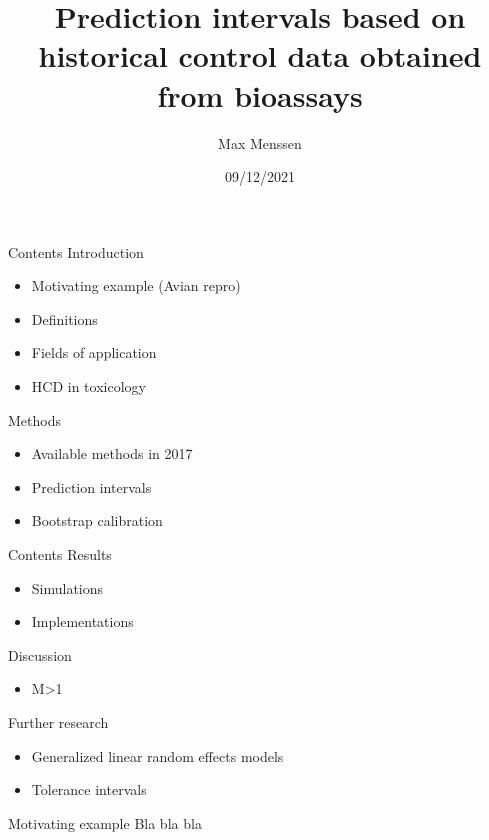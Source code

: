 \documentclass[
  ignorenonframetext,
]{beamer}
\title{Prediction intervals based on historical control data obtained
from bioassays}
\author{Max Menssen}
\date{09/12/2021}
\providecommand{\tightlist}{%
  \setlength{\itemsep}{0pt}\setlength{\parskip}{0pt}}
\begin{document}
\frame{\titlepage}

\begin{frame}{Contents}
\protect\hypertarget{contents}{}
Introduction

\begin{itemize}
\tightlist
\item
  Motivating example (Avian repro)
\item
  Definitions
\item
  Fields of application
\item
  HCD in toxicology
\end{itemize}

Methods

\begin{itemize}
\tightlist
\item
  Available methods in 2017
\item
  Prediction intervals
\item
  Bootstrap calibration
\end{itemize}
\end{frame}

\begin{frame}{Contents}
\protect\hypertarget{contents-1}{}
Results

\begin{itemize}
\tightlist
\item
  Simulations
\item
  Implementations
\end{itemize}

Discussion

\begin{itemize}
\tightlist
\item
  M\textgreater1
\end{itemize}

Further research

\begin{itemize}
\tightlist
\item
  Generalized linear random effects models
\item
  Tolerance intervals
\end{itemize}
\end{frame}

\begin{frame}{}
\protect\hypertarget{section}{}
\end{frame}

\begin{frame}{Motivating example}
\protect\hypertarget{motivating-example}{}
Bla bla bla
\end{frame}
\end{document}
